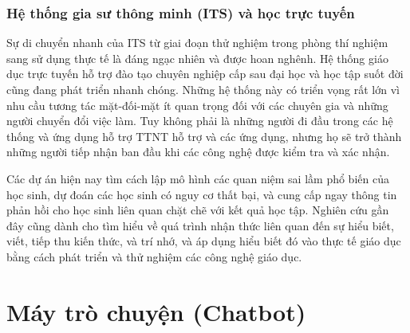 \subsubsection{Hệ thống gia sư thông minh (ITS) và học trực tuyến}
Sự di chuyển nhanh của ITS từ giai đoạn thử nghiệm trong phòng thí nghiệm sang sử dụng thực tế là đáng ngạc nhiên và được hoan nghênh. Hệ thống giáo dục trực tuyến hỗ trợ đào tạo chuyên nghiệp cấp sau đại học và học tập suốt đời cũng đang phát triển nhanh chóng. Những hệ thống này có triển vọng rất lớn vì nhu cầu tương tác mặt-đối-mặt ít quan trọng đối với các chuyên gia và những người chuyển đổi việc làm. Tuy không phải là những người đi đầu trong các hệ thống và ứng dụng hỗ trợ TTNT hỗ trợ và các ứng dụng, nhưng họ sẽ trở thành những người tiếp nhận ban đầu khi các công nghệ được kiểm tra và xác nhận.\par
Các dự án hiện nay tìm cách lập mô hình các quan niệm sai lầm phổ biến của học sinh, dự đoán các học sinh có nguy cơ thất bại, và cung cấp ngay thông tin phản hồi cho học sinh liên quan chặt chẽ với kết quả học tập. Nghiên cứu gần đây cũng dành cho tìm hiểu về quá trình nhận thức liên quan đến sự hiểu biết, viết, tiếp thu kiến thức, và trí nhớ, và áp dụng hiểu biết đó vào thực tế giáo dục bằng cách phát triển và thử nghiệm các công nghệ giáo dục.

\section{Máy trò chuyện (Chatbot)}
